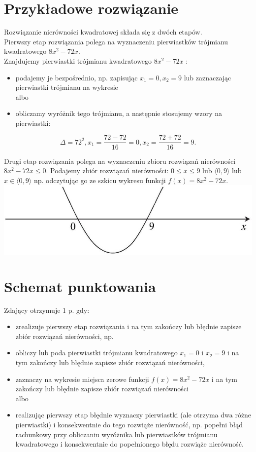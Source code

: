 \documentclass[10pt]{article}
\begin{document}
\section*{Przykładowe rozwiązanie}
Rozwiązanie nierówności kwadratowej składa się z dwóch etapów.\\
Pierwszy etap rozwiązania polega na wyznaczeniu pierwiastków trójmianu kwadratowego $8 x^{2}-72 x$.\\
Znajdujemy pierwiastki trójmianu kwadratowego $8 x^{2}-72 x$ :

\begin{itemize}
  \item podajemy je bezpośrednio, np. zapisując $x_{1}=0, x_{2}=9$ lub zaznaczając pierwiastki trójmianu na wykresie\\
albo
  \item obliczamy wyróżnik tego trójmianu, a następnie stosujemy wzory na pierwiastki:
\end{itemize}

$$
\Delta=72^{2}, x_{1}=\frac{72-72}{16}=0, x_{2}=\frac{72+72}{16}=9 .
$$

Drugi etap rozwiązania polega na wyznaczeniu zbioru rozwiązań nierówności $8 x^{2}-72 x \leq 0$. Podajemy zbiór rozwiązań nierówności: $0 \leq x \leq 9$ lub $\langle 0,9\rangle$ lub $x \in\langle 0,9\rangle$ np. odczytując go ze szkicu wykresu funkcji $f(x)=8 x^{2}-72 x$.\\
\includegraphics[max width=\textwidth, center]{2025_02_07_e35f706dbfcfb4be75cfg-06}

\section*{Schemat punktowania}
Zdający otrzymuje 1 p. gdy:

\begin{itemize}
  \item zrealizuje pierwszy etap rozwiązania i na tym zakończy lub błędnie zapisze zbiór rozwiązań nierówności, np.
  \item obliczy lub poda pierwiastki trójmianu kwadratowego $x_{1}=0$ i $x_{2}=9$ i na tym zakończy lub błędnie zapisze zbiór rozwiązań nierówności,
  \item zaznaczy na wykresie miejsca zerowe funkcji $f(x)=8 x^{2}-72 x$ i na tym zakończy lub błędnie zapisze zbiór rozwiązań nierówności\\
albo
  \item realizując pierwszy etap błędnie wyznaczy pierwiastki (ale otrzyma dwa różne pierwiastki) i konsekwentnie do tego rozwiąże nierówność, np. popełni błąd\\
rachunkowy przy obliczaniu wyróżnika lub pierwiastków trójmianu kwadratowego i konsekwentnie do popełnionego błędu rozwiąże nierówność.
\end{itemize}
\end{document}
